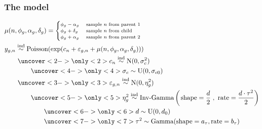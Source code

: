 \documentclass[handout]{beamer}
\providecommand{\e}{\varepsilon}
\numberwithin{equation}{section}
\begin{document}
\begin{frame}
\frametitle{The model}

\begin{align*}
& \scriptsize \mu(n, \phi_g, \alpha_g, \delta_g) = \begin{cases}
\phi_g - \alpha_g & \text{ sample $n$ from parent 1} \\
\phi_g + \delta_g & \text{ sample $n$ from child} \\
\phi_g + \alpha_g & \text{ sample $n$ from parent 2} \\
\end{cases} \\ 
&y_{g,n} \stackrel{\text{ind}}{\sim} \text{Poisson}(\exp(c_n + \e_{g, n} + \mu(n, \phi_g, \alpha_g, \delta_g))) \\
&\qquad \uncover<2->{\only<2>{\color{blue}}c_n \stackrel{\text{ind}}{\sim} \text{N}(0, \sigma_c^2)} \\
& \qquad \qquad \uncover<4->{\only<4>{\color{blue}}\sigma_c \stackrel{\text{}}{\sim} \text{U}(0, \sigma_{c0})} \\
& \qquad \uncover<3->{\only<3>{\color{blue}}\e_{g, n} \stackrel{\text{ind}}{\sim} \text{N}(0, \eta_g^2)} \\
& \qquad \qquad \uncover<5->{\only<5>{\color{blue}}\eta_g^2 \stackrel{\text{ind}}{\sim} \text{Inv-Gamma}\left (\left . \text{shape} = \frac{d}{2} \right ., \ \text{rate} =  \frac{d \cdot \tau^2}{2} \right)} \\
& \qquad \qquad \qquad \uncover<6->{\only<6>{\color{blue}} d \stackrel{\text{}}{\sim} \text{U}(0, d_0)} \\
& \qquad \qquad \qquad \uncover<7->{\only<7>{\color{blue}} \tau^2 \stackrel{\text{}}{\sim} \text{Gamma}(\text{shape} = a_\tau, \text{rate} = b_\tau)} \\
\end{align*}
\end{frame}
\end{document}
